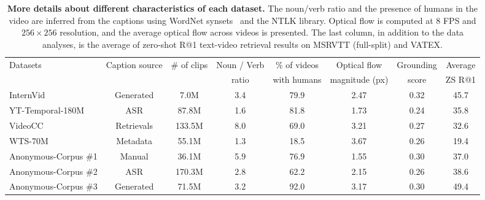 \documentclass{article}
\theoremstyle{plain}
\theoremstyle{definition}
\theoremstyle{remark}
\begin{document}
\begin{table}
    \caption{
    \textbf{More details about different characteristics of each dataset.}
    The noun/verb ratio and the presence of humans in the video are inferred from the captions using WordNet synsets~\cite{fellbaum2005wordnet} and the NTLK library. Optical flow is computed at $8$ FPS and $256 \times 256$ resolution, and the average optical flow across videos is presented. The last column, in addition to the data analyses, is the average of zero-shot R@1 text-video retrieval results on MSRVTT (full-split) and VATEX.
    }
    \label{tbl:corpus}
    \begin{center}
    \begin{scriptsize}
\begin{tabular}{l|ccccccc}
    \toprule
    \multirow{2}{*}{Datasets} & \multirow{2}{*}{Caption source} & \multirow{2}{*}{\# of clips} & Noun / Verb & \% of videos & Optical flow & Grounding & Average \\
    & & & ratio & with humans & magnitude (px) & score & ZS R@1 \\
    \midrule
    InternVid~\cite{wang2023internvid} & Generated & 7.0M & 3.4 & 79.9 & 2.47 & 0.32 & 45.7 \\
    YT-Temporal-180M~\cite{zellers2021merlot} & ASR & 87.8M & 1.6 & 81.8 & 1.73 & 0.24 & 35.8 \\
    VideoCC~\cite{nagrani2022learning} & Retrievals & 133.5M & 8.0 & 69.0 & 3.21 & 0.27 & 32.6 \\
    WTS-70M~\cite{stroud2020learning} & Metadata & 55.1M & 1.3 & 18.5 & 3.67 & 0.26 & 19.4 \\
    \midrule
    Anonymous-Corpus \#1 & Manual & 36.1M & 5.9 & 76.9 & 1.55 & 0.30 & 37.0 \\
    Anonymous-Corpus \#2 & ASR & 170.3M & 2.8 & 62.2 & 2.15 & 0.26 & 38.6 \\
    Anonymous-Corpus \#3 & Generated & 71.5M & 3.2 & 92.0 & 3.17 & 0.30 & 49.4 \\
    \bottomrule
    \end{tabular}
\end{scriptsize}
    \end{center}
    \vskip -0.1in
\end{table}
\end{document}
